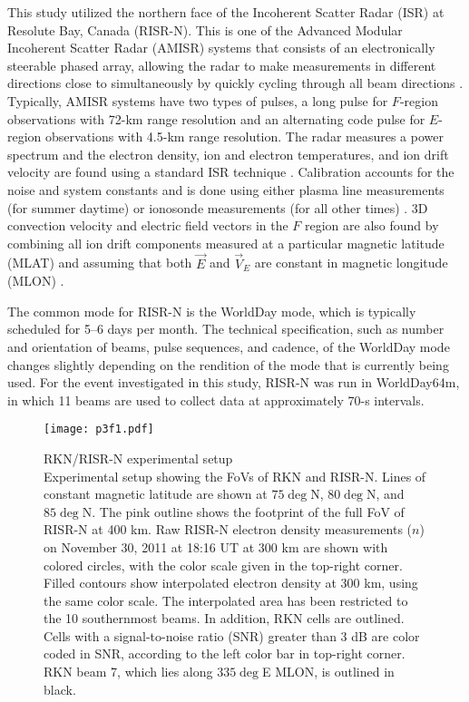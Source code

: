 This study utilized the northern face of the Incoherent Scatter Radar (ISR) at Resolute Bay, Canada (RISR-N).  This is one of the Advanced Modular Incoherent Scatter Radar (AMISR) systems that consists of an electronically steerable phased array, allowing the radar to make measurements in different directions close to simultaneously by quickly cycling through all beam directions \citep{Bahcivan2010}.  Typically, AMISR systems have two types of pulses, a long pulse for \(F\)-region observations with 72-km range resolution and an alternating code pulse for \(E\)-region observations with 4.5-km range resolution.  The radar measures a power spectrum and the electron density, ion and electron temperatures, and ion drift velocity are found using a standard ISR technique \citep{Evans1969,Rishbeth1985,Nicolls2007a}.  Calibration accounts for the noise and system constants \citep{Nicolls2007a} and is done using either plasma line measurements (for summer daytime) or ionosonde measurements (for all other times) \citep{Bahcivan2010,Themens2014}.  3D convection velocity and electric field vectors in the $F$ region are also found by combining all ion drift components measured at a particular magnetic latitude (MLAT) and assuming that both \(\vec{E}\) and \(\vec{V}_E\) are constant in magnetic longitude (MLON) \citep{Heinselman2008}.

The common mode for RISR-N is the WorldDay mode, which is typically scheduled for 5--6 days per month.  The technical specification, such as number and orientation of beams, pulse sequences, and cadence, of the WorldDay mode changes slightly depending on the rendition of the mode that is currently being used.  For the event investigated in this study, RISR-N was run in WorldDay64m, in which 11 beams are used to collect data at approximately 70-s intervals.

\begin{figure}
	\texttt{[image: p3f1.pdf]}
  \caption[RKN/RISR-N experimental setup]{{\:}RKN/RISR-N experimental setup\\ Experimental setup showing the FoVs of RKN and RISR-N. Lines of constant magnetic latitude are shown at \(75\deg\)N, \(80\deg\)N, and \(85\deg\)N. The pink outline shows the footprint of the full FoV of RISR-N at 400 km.  Raw RISR-N electron density measurements (\(n\)) on November 30, 2011 at 18:16 UT at 300 km are shown with colored circles, with the color scale given in the top-right corner.  Filled contours show interpolated electron density at 300 km, using the same color scale.  The interpolated area has been restricted to the 10 southernmost beams. In addition, RKN cells are outlined.  Cells with a signal-to-noise ratio (SNR) greater than 3 dB are color coded in SNR, according to the left color bar in top-right corner. RKN beam 7, which lies along \(335\deg\)E MLON, is outlined in black.}
  \label{fig:radar_map}
\end{figure}

